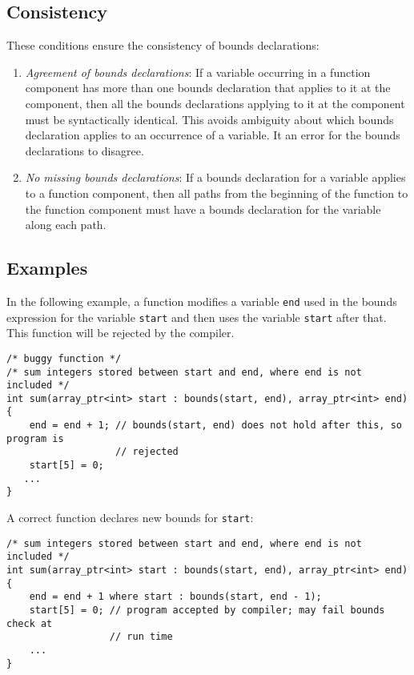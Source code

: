  \subsection{Consistency}

These conditions ensure the consistency of bounds declarations:

\begin{enumerate}
\item
  \emph{Agreement of bounds declarations}: If a variable occurring in a
  function component has more than one bounds declaration that applies
  to it at the component, then all the bounds declarations applying to
  it at the component must be syntactically identical. This avoids
  ambiguity about which bounds declaration applies to an occurrence of a
  variable. It an error for the bounds declarations to disagree.
\item
  \emph{No missing bounds declarations}: If a bounds declaration for a
  variable applies to a function component, then all paths from the
  beginning of the function to the function component must have a bounds
  declaration for the variable along each path.
\end{enumerate}

\subsection{Examples}
\label{examples:consistency}

In the following example, a function modifies a variable \texttt{end}
used in the bounds expression for the variable \texttt{start} and then
uses the variable \texttt{start} after that. This function will be
rejected by the compiler.

\begin{verbatim}
/* buggy function */
/* sum integers stored between start and end, where end is not included */
int sum(array_ptr<int> start : bounds(start, end), array_ptr<int> end)
{ 
    end = end + 1; // bounds(start, end) does not hold after this, so program is
                   // rejected
    start[5] = 0;
   ...
}
\end{verbatim}

A correct function declares new bounds for \texttt{start}:

\begin{verbatim}
/* sum integers stored between start and end, where end is not included */
int sum(array_ptr<int> start : bounds(start, end), array_ptr<int> end)
{ 
    end = end + 1 where start : bounds(start, end - 1);
    start[5] = 0; // program accepted by compiler; may fail bounds check at 
                  // run time
    ...
}
\end{verbatim}


